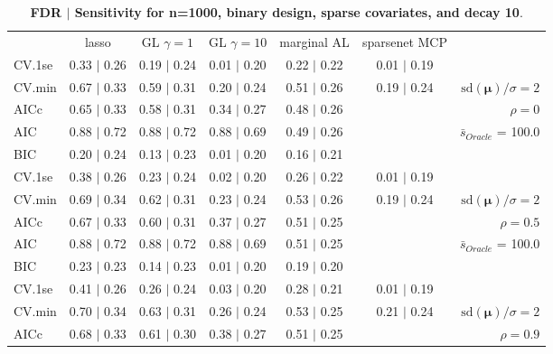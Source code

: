 \clearpage
\begin{table}\vspace{-.5cm}
\caption[l]{ {\it }
{ \bf FDR $\boldsymbol{\mid}$ Sensitivity for n=1000, binary design, sparse covariates, and  decay  10}.}
\vspace{-.5cm}
\footnotesize{}
\begin{center}
\begin{tabular}{l*{5}{c}|r}
 & lasso & GL $\gamma=1$ & GL $\gamma=10$ & marginal AL & sparsenet MCP  & \\
 \cline{1-7}
CV.1se & 0.33 $\mid$ 0.26 & 0.19 $\mid$ 0.24 & 0.01 $\mid$ 0.20 & 0.22 $\mid$ 0.22 & 0.01 $\mid$ 0.19 & \\
CV.min & 0.67 $\mid$ 0.33 & 0.59 $\mid$ 0.31 & 0.20 $\mid$ 0.24 & 0.51 $\mid$ 0.26 & 0.19 $\mid$ 0.24 &  $\mathrm{sd}(\mathbf{\mu})/\sigma=2$ \\
AICc & 0.65 $\mid$ 0.33 & 0.58 $\mid$ 0.31 & 0.34 $\mid$ 0.27 & 0.48 $\mid$ 0.26 & & $\rho=0$ \\
AIC & 0.88 $\mid$ 0.72 & 0.88 $\mid$ 0.72 & 0.88 $\mid$ 0.69 & 0.49 $\mid$ 0.26 & &  \multirow{2}{*}{$\bar{s}_{Oracle}$ = 100.0} \\
BIC & 0.20 $\mid$ 0.24 & 0.13 $\mid$ 0.23 & 0.01 $\mid$ 0.20 & 0.16 $\mid$ 0.21 & &  \\
 \hline 
CV.1se & 0.38 $\mid$ 0.26 & 0.23 $\mid$ 0.24 & 0.02 $\mid$ 0.20 & 0.26 $\mid$ 0.22 & 0.01 $\mid$ 0.19 & \\
CV.min & 0.69 $\mid$ 0.34 & 0.62 $\mid$ 0.31 & 0.23 $\mid$ 0.24 & 0.53 $\mid$ 0.26 & 0.19 $\mid$ 0.24 &  $\mathrm{sd}(\mathbf{\mu})/\sigma=2$ \\
AICc & 0.67 $\mid$ 0.33 & 0.60 $\mid$ 0.31 & 0.37 $\mid$ 0.27 & 0.51 $\mid$ 0.25 & & $\rho=0.5$ \\
AIC & 0.88 $\mid$ 0.72 & 0.88 $\mid$ 0.72 & 0.88 $\mid$ 0.69 & 0.51 $\mid$ 0.25 & &  \multirow{2}{*}{$\bar{s}_{Oracle}$ = 100.0} \\
BIC & 0.23 $\mid$ 0.23 & 0.14 $\mid$ 0.23 & 0.01 $\mid$ 0.20 & 0.19 $\mid$ 0.20 & &  \\
 \hline 
CV.1se & 0.41 $\mid$ 0.26 & 0.26 $\mid$ 0.24 & 0.03 $\mid$ 0.20 & 0.28 $\mid$ 0.21 & 0.01 $\mid$ 0.19 & \\
CV.min & 0.70 $\mid$ 0.34 & 0.63 $\mid$ 0.31 & 0.26 $\mid$ 0.24 & 0.53 $\mid$ 0.25 & 0.21 $\mid$ 0.24 &  $\mathrm{sd}(\mathbf{\mu})/\sigma=2$ \\
AICc & 0.68 $\mid$ 0.33 & 0.61 $\mid$ 0.30 & 0.38 $\mid$ 0.27 & 0.51 $\mid$ 0.25 & & $\rho=0.9$ \\

\end{tabular}
\end{center}
\end{table}
